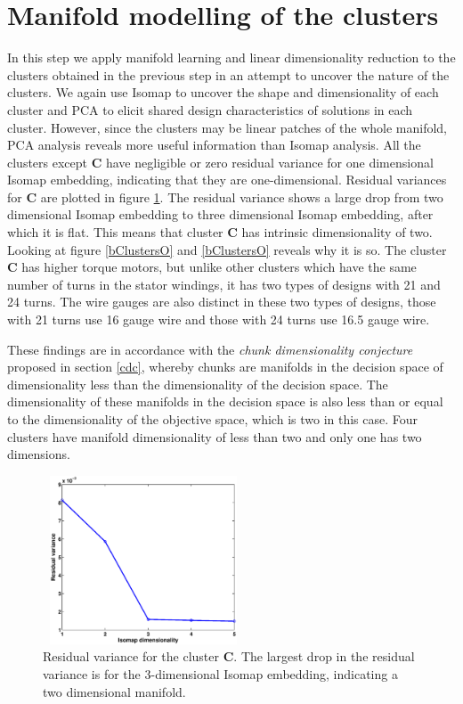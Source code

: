 \section{Manifold modelling of the clusters}
In this step we apply manifold learning and linear dimensionality reduction
to the clusters obtained in the previous step in an attempt to uncover the
nature of the clusters. We again use Isomap to uncover the shape and
dimensionality of each cluster and PCA to elicit shared design
characteristics of solutions in each cluster. However, since the clusters
may be linear patches of the whole manifold, PCA analysis reveals more
useful information than Isomap analysis. All the clusters except \textbf{C}
have negligible or zero residual variance for one dimensional Isomap
embedding, indicating that they are one-dimensional.  Residual variances
for \textbf{C} are plotted in figure \ref{bClusterCrv}. The residual
variance shows a large drop from two dimensional Isomap embedding to three
dimensional Isomap embedding, after which it is flat. This means that
cluster \textbf{C} has intrinsic dimensionality of two. Looking at figure
\ref{bClustersO} and \ref{bClustersO} reveals why it is so. The cluster
\textbf{C} has higher torque motors, but unlike other clusters which have
the same number of turns in the stator windings, it has two types of
designs with 21 and 24 turns. The wire gauges are also distinct in these
two types of designs, those with 21 turns use 16 gauge wire and those with
24 turns use 16.5 gauge wire.

These findings are in accordance with the {\em chunk dimensionality
  conjecture} proposed in section \ref{cdc}, whereby chunks are manifolds
in the decision space of dimensionality less than the dimensionality of the
decision space. The dimensionality of these manifolds in the decision space
is also less than or equal to the dimensionality of the objective space,
which is two in this case. Four clusters have manifold dimensionality of
less than two and only one has two dimensions.

 
\begin{figure}[ht]
  \begin{center}
    \includegraphics[width=60mm, height=50mm]{dia/bclusterCrv.eps} 
    \caption{Residual variance for the cluster \textbf{C}. The largest drop
      in the residual variance is for the 3-dimensional Isomap embedding,
      indicating a two dimensional manifold.}
    \label{bClusterCrv}
  \end{center}
\end{figure}

